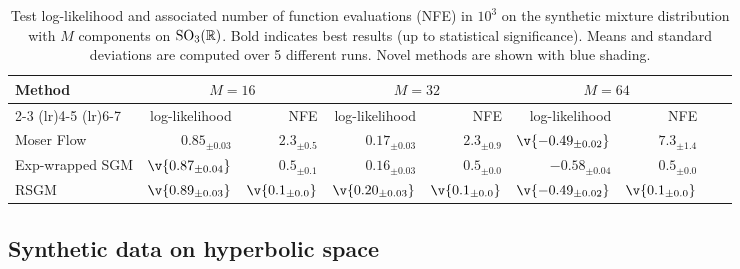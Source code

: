 \begin{table}[t]
	\centering
	\small
	\begin{tabular}{lrrrrrrrr}
		\toprule
		\multirow{2}{4.5em}{Method} & \multicolumn{2}{c}{$M=16$}                & \multicolumn{2}{c}{$M=32$}              & \multicolumn{2}{c}{$M=64$}                                                                                                                                                  \\ \cmidrule(lr){2-3} \cmidrule(lr){4-5} \cmidrule(lr){6-7}
		                            & log-likelihood                            & NFE                                     & log-likelihood                            & NFE                                      & log-likelihood                             & NFE                                     \\

		\midrule

		Moser Flow                  & ${0.85_{\pm 0.03}}$                       & ${2.3_{\pm 0.5}}$                       & ${0.17_{\pm 0.03}}$                       & ${2.3_{\pm 0.9}}$                        & $\v{-0.49_{\pm 0.02}}$                     & ${7.3_{\pm 1.4}}$                       \\ Exp-wrapped SGM           & \cellcolor{blue!
		20} $\v{0.87_{\pm 0.04}}$   & \cellcolor{blue!20} ${0.5_{\pm 0.1}}$     & \cellcolor{blue!20} ${0.16_{\pm 0.03}}$ & \cellcolor{blue!20} ${0.5_{\pm 0.0}}$     & \cellcolor{blue!20} ${-0.58_{\pm 0.04}}$ & \cellcolor{blue!20} ${0.5_{\pm 0.0}}$                                                \\
		RSGM                        & \cellcolor{blue!20} $\v{0.89_{\pm 0.03}}$ & \cellcolor{blue!20} $\v{0.1_{\pm 0.0}}$ & \cellcolor{blue!20} $\v{0.20_{\pm 0.03}}$ & \cellcolor{blue!20} $\v{0.1_{\pm 0.0}}$  & \cellcolor{blue!20} $\v{-0.49_{\pm 0.02}}$ & \cellcolor{blue!20} $\v{0.1_{\pm 0.0}}$ \\

		\bottomrule
	\end{tabular}
	\caption{
		Test log-likelihood and associated number of function evaluations (NFE) in $10^3$ on the synthetic mixture distribution with $M$ components on $\mathrm{SO}_3(\mathbb{R})$.
		Bold indicates best results (up to statistical significance).
		Means and standard deviations are computed over 5 different runs.
		Novel methods are shown with blue shading.
	}
	\label{tab:so3}
\end{table}

\subsection{Synthetic data on hyperbolic space}


